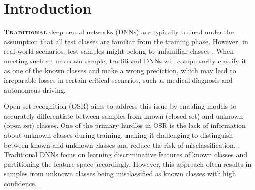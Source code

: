 \documentclass{gji}
\begin{document}
\section{Introduction} \label{section1}
\textbf{\textsc{Traditional}} deep neural networks (DNNs) are typically trained under the assumption that all test classes are familiar from the training phase. However, in real-world scenarios, test samples might belong to unfamiliar classes \cite {43}. When meeting such an unknown sample, traditional DNNs will compulsorily classify it as one of the known classes and make a wrong prediction, which may lead to irreparable losses in certain critical scenarios, such as medical diagnosis and autonomous driving.

Open set recognition (OSR) aims to address this issue by enabling models to accurately differentiate between samples from known (closed set) and unknown (open set) classes. One of the primary hurdles in OSR is the lack of information about unknown classes during training, making it challenging to distinguish between known and unknown classes and reduce the risk of misclassification.  \cite {34}. Traditional DNNs focus on learning discriminative features of known classes and partitioning the feature space accordingly. However, this approach often results in samples from unknown classes being misclassified as known classes with high confidence. \cite {42}. 
\end{document}
